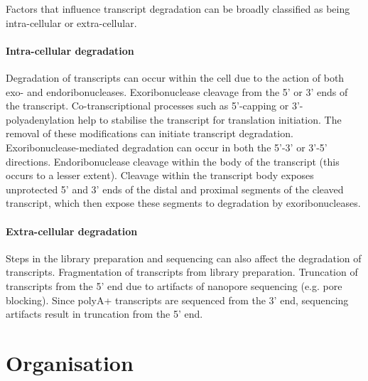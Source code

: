 Factors that influence transcript degradation can be broadly classified as being intra-cellular or extra-cellular. 

\paragraph{Intra-cellular degradation} Degradation of transcripts can occur within the cell due to the action of both exo- and endoribonucleases. Exoribonuclease cleavage from the 5’ or 3’ ends of the transcript. Co-transcriptional processes such as 5’-capping or 3’-polyadenylation help to stabilise the transcript for translation initiation. The removal of these modifications can initiate transcript degradation. Exoribonuclease-mediated degradation can occur in both the 5’-3’ or 3’-5’ directions. Endoribonuclease cleavage within the body of the transcript (this occurs to a lesser extent). Cleavage within the transcript body exposes unprotected 5’ and 3’ ends of the distal and proximal segments of the cleaved transcript, which then expose these segments to degradation by exoribonucleases. 

\paragraph{Extra-cellular degradation} Steps in the library preparation and sequencing can also affect the degradation of transcripts. Fragmentation of transcripts from library preparation. Truncation of transcripts from the 5’ end due to artifacts of nanopore sequencing (e.g. pore blocking). Since polyA+ transcripts are sequenced from the 3’ end, sequencing artifacts result in truncation from the 5’ end.



\section{Organisation}

